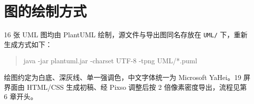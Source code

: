 \section{图的绘制方式}

16 张 UML 图均由 PlantUML 绘制，源文件与导出图同名存放在 \texttt{UML/} 下，重新生成方式如下：

\begin{quote}
\ttfamily
java -jar plantuml.jar -charset UTF-8 -tpng UML/*.puml
\end{quote}

绘图约定为白底、深灰线、单一强调色，中文字体统一为 Microsoft YaHei。19 屏界面由 HTML/CSS 生成初稿、经 Pixso 调整后按 2 倍像素密度导出，流程见第 6 章开头。
